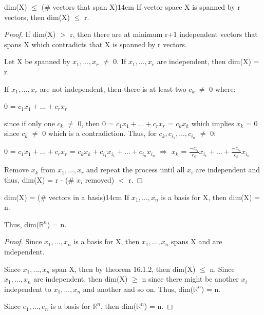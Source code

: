     \vspace{0.5cm}



    \begin{wtheorem}{dim(X) $\leq$ (\# vectors that span X)}{14cm}
        If vector space X is spanned by r vectors, then dim(X) $\leq$ r.
    \end{wtheorem}

    \begin{proof}
        If dim(X) $>$ r, then there are at minimum r+1 independent vectors
        that spans X which contradicts that X is spanned by r vectors.

        Let X be spanned by $x_1,...,x_r$ $\not =$ 0.
        If $x_1,...,x_r$ are independent, then dim(X) = r.

        If $x_1,...,x_r$ are not independent, then there is at least two
        $c_k$ $\not =$ 0 where:

        \hspace{0.5cm}
        0 = $c_1x_1 + ... + c_rx_r$

        since if only one $c_k$ $\not =$ 0, then 
        0 = $c_1x_1 + ... + c_rx_r$ = $c_kx_k$ which implies $x_k$ = 0
        since $c_k$ $\not =$ 0 which is a contradiction.
        Thus, for $c_k,c_{i_1},...,c_{i_n}$ $\not =$ 0:

        \hspace{0.5cm}
        0 = $c_1x_1 + ... + c_rx_r$
        = $c_kx_k + c_{i_1}x_{i_1} + ... + c_{i_n}x_{i_n}$
        \hspace{0.7cm}
        $\Rightarrow$
        \hspace{0.7cm}
        $x_k$ = $\frac{-c_{i_1}}{c_k}x_{i_1} + ... + \frac{-c_{i_n}}{c_k}x_{i_n}$

        Remove $x_k$ from $x_1,...,x_r$ and repeat the process
        until all $x_i$ are independent and thus,
        dim(X) = r - (\# $x_i$ removed) $<$ r.
    \end{proof}

    \newpage



    \begin{corollary}{dim(X) = (\# vectors in a basis)}{14cm}
        If $x_1,...,x_n$ is a basis for X, then dim(X) = n.
        
        Thus, dim($\mathbb{R}^n$) = n.
    \end{corollary}

    \begin{proof}
        Since $x_1,...,x_n$ is a basis for X, then
        $x_1,...,x_n$ spans X and are independent.

        Since $x_1,...,x_n$ span X, then by {\color{red} theorem 16.1.2},
        then dim(X) $\leq$ n.
        Since $x_1,...,x_n$ are independent, then dim(X) $\geq$ n
        since there might be another $x_i$ independent to $x_1,...,x_n$
        and another and so on.
        Thus, dim($\mathbb{R}^n$) = n.

        Since $e_1,...,e_n$ is a basis for $\mathbb{R}^n$, then
        dim($\mathbb{R}^n$) = n.
    \end{proof}

